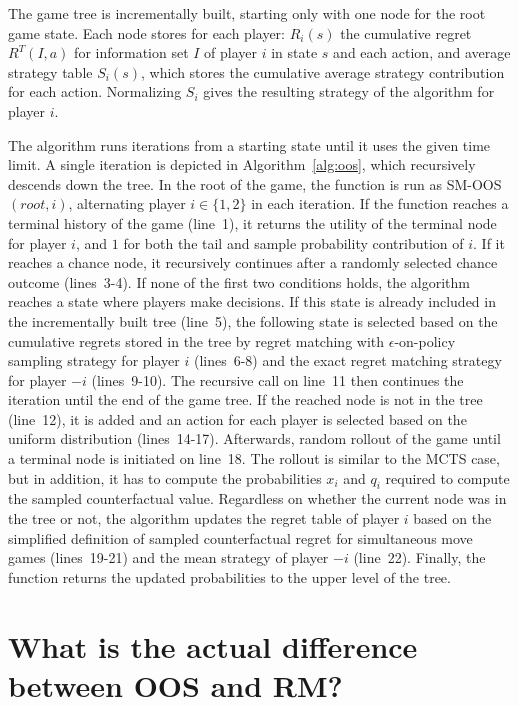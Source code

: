 \documentclass[preprint,12pt]{elsarticle}
\begin{document}
The game tree is incrementally built, starting only with one node for the root game state.
Each node stores for each player: $R_i(s)$ the cumulative regret $R^T(I,a)$ for information set $I$ of player $i$ in state $s$ and each action,
and average strategy table $S_i(s)$, which stores the cumulative average strategy contribution for each action.
Normalizing $S_i$ gives the resulting strategy of the algorithm for player $i$.

The algorithm runs iterations from a starting state until it uses the given time limit. A single iteration is depicted in Algorithm~\ref{alg:oos}, which recursively descends down the tree. In the root of the game, the function is run as SM-OOS$(root, i)$, alternating player $i\in\{1,2\}$ in each iteration. If the function reaches a terminal history of the game (line~1), it returns the utility of the terminal node for player $i$, and $1$ for both the tail and sample probability contribution of $i$. If it reaches a chance node, it recursively continues after a randomly selected chance outcome (lines~3-4). If none of the first two conditions holds, the algorithm reaches a state where players make decisions. If this state is already included in the incrementally built tree (line~5), the following state is selected based on the cumulative regrets stored in the tree by regret matching with $\epsilon$-on-policy sampling strategy for player $i$ (lines~6-8) and the exact regret matching strategy for player $-i$ (lines~9-10). The recursive call on line~11 then continues the iteration until the end of the game tree. If the reached node is not in the tree (line~12), it is added and an action for each player is selected based on the uniform distribution (lines~14-17). Afterwards, random rollout of the game until a terminal node is initiated on line~18. The rollout is similar to the MCTS case, but in addition, it has to compute the probabilities $x_i$ and $q_i$ required to compute the sampled counterfactual value. Regardless on whether the current node was in the tree or not, the algorithm updates the regret table of player $i$ based on the simplified definition of sampled counterfactual regret for simultaneous move games (lines~19-21) and the mean strategy of player $-i$ (line~22).
Finally, the function returns the updated probabilities to the upper level of the tree.


\section{What is the actual difference between OOS and RM?}
\end{document}
